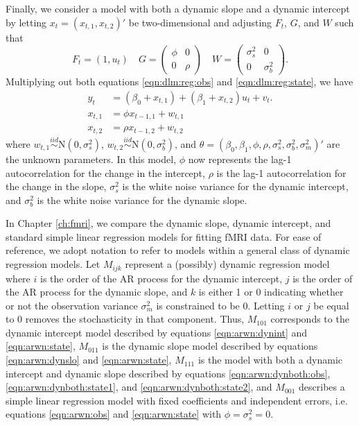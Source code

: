 Finally, we consider a model with both a dynamic slope and a dynamic intercept by letting $x_t = (x_{t,1},x_{t,2})'$ be two-dimensional and adjusting $F_t$, $G$, and $W$ such that
\begin{equation}
F_t = (1, u_t) \quad G = \left(\begin{array}{cc} \phi & 0 \\ 0 & \rho \end{array}\right) \quad W = \left(\begin{array}{cc} \sigma^2_s & 0 \\ 0 & \sigma^2_b \end{array}\right). \label{eqn:arwn:dynboth:def}
\end{equation}
Multiplying out both equations \eqref{eqn:dlm:reg:obs} and \eqref{eqn:dlm:reg:state}, we have
\begin{align}
y_t &= (\beta_0 + x_{t,1}) + (\beta_1 + x_{t,2})u_t + v_t. \label{eqn:arwn:dynboth:obs} \\
x_{t,1} &= \phi x_{t-1,1} + w_{t,1} \label{eqn:arwn:dynboth:state1} \\
x_{t,2} &= \rho x_{t-1,2} + w_{t,2} \label{eqn:arwn:dynboth:state2}
\end{align}
where $w_{t,1} \stackrel{iid}{\sim} \mbox{N}(0,\sigma^2_s)$, $w_{t,2} \stackrel{iid}{\sim} \mbox{N}(0,\sigma^2_b)$, and $\theta = (\beta_0,\beta_1,\phi,\rho,\sigma^2_s,\sigma^2_b,\sigma^2_m)'$ are the unknown parameters. In this model, $\phi$ now represents the lag-1 autocorrelation for the change in the intercept, $\rho$ is the lag-1 autocorrelation for the change in the slope, $\sigma^2_s$ is the white noise variance for the dynamic intercept, and $\sigma^2_b$ is the white noise variance for the dynamic slope.

In Chapter \ref{ch:fmri}, we compare the dynamic slope, dynamic intercept, and standard simple linear regression models for fitting fMRI data. For ease of reference, we adopt notation to refer to models within a general class of dynamic regression models. Let $M_{ijk}$ represent a (possibly) dynamic regression model where $i$ is the order of the AR process for the dynamic intercept, $j$ is the order of the AR process for the dynamic slope, and $k$ is either 1 or 0 indicating whether or not the observation variance $\sigma^2_m$ is constrained to be 0. Letting $i$ or $j$ be equal to 0 removes the stochasticity in that component. Thus, $M_{101}$ corresponds to the dynamic intercept model described by equations \ref{eqn:arwn:dynint} and \ref{eqn:arwn:state}, $M_{011}$ is the dynamic slope model described by equations \ref{eqn:arwn:dynslo} and \ref{eqn:arwn:state}, $M_{111}$ is the model with both a dynamic intercept and dynamic slope described by equations \ref{eqn:arwn:dynboth:obs}, \ref{eqn:arwn:dynboth:state1}, and \ref{eqn:arwn:dynboth:state2}, and $M_{001}$ describes a simple linear regression model with fixed coefficients and independent errors, i.e. equations \eqref{eqn:arwn:obs} and \eqref{eqn:arwn:state} with $\phi = \sigma^2_s = 0$.

